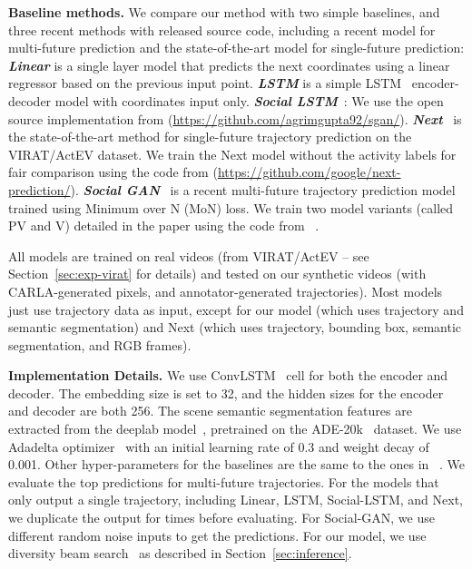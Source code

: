 \documentclass[10pt,twocolumn,letterpaper]{article}
\begin{document}
\noindent\textbf{Baseline methods.} 
We compare our method with  two simple baselines, and three recent methods with released source code,
including  a recent model for multi-future prediction and the state-of-the-art model for single-future prediction:
\textbf{\textit{Linear}} is a single layer model that predicts the next coordinates using a linear regressor based on the previous input point.
\textbf{\textit{LSTM}} is a simple LSTM~\cite{hochreiter1997long} encoder-decoder model with coordinates input only. 
\textbf{\textit{Social LSTM}}~\cite{alahi2016social}: We use the open source implementation from {\footnotesize (\url{https://github.com/agrimgupta92/sgan/})}.
\textbf{\textit{Next}}~\cite{liang2019peeking} is the state-of-the-art method for single-future trajectory prediction on the VIRAT/ActEV dataset. We train the Next model without the activity labels for fair comparison using the code from {\footnotesize (\url{https://github.com/google/next-prediction/})}.
\textbf{\textit{Social GAN}}~\cite{gupta2018social} is a recent multi-future trajectory prediction model trained using Minimum over N (MoN) loss. We train two model variants (called PV and V) detailed in the paper using the code from~\cite{gupta2018social} .

All models are trained on real videos
(from VIRAT/ActEV -- see Section~\ref{sec:exp-virat} for  details)
and tested on our synthetic videos
(with CARLA-generated pixels,
and annotator-generated trajectories).
Most models just use trajectory data as input,
except for our model
(which uses trajectory and semantic segmentation)
and Next
(which uses trajectory, bounding box,
semantic segmentation, and RGB frames).


\noindent\textbf{Implementation Details.}
We use ConvLSTM~\cite{xingjian2015convolutional} cell for both the encoder and decoder. 
The embedding size is set to 32, and the hidden sizes for the encoder and decoder are both 256. 
The scene semantic segmentation features are extracted from the deeplab model~\cite{chen2017deeplab}, pretrained on the ADE-20k~\cite{zhou2017scene} dataset.
We use Adadelta optimizer~\cite{zeiler2012adadelta} with an initial learning rate of 0.3 and weight decay of 0.001. 
Other hyper-parameters for the baselines are the same to the ones in ~\cite{gupta2018social, liang2019peeking}.
We evaluate the top  predictions for multi-future trajectories. For the models that only output a single trajectory, including Linear, LSTM, Social-LSTM, and Next, we duplicate the output for  times before evaluating. For Social-GAN, we use  different random noise inputs to get the predictions. For our model, we use diversity beam search~\cite{li2016simple,plotz2018neural} as described in Section~\ref{sec:inference}.
\end{document}
